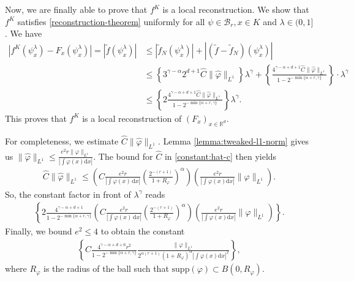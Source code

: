 Now, we are finally able to prove that $f^K$ is a local reconstruction. We show that $f^K$ satisfies \eqref{reconstruction-theorem} uniformly for all $\psi \in \mathcal{B}_r, x \in K$ and $\lambda \in (0,1]$. We have
\begin{align*}
    |f^K(\psi^\lambda_x) - F_x(\psi^\lambda_x)| = |\tilde f (\psi^\lambda_x)| 
    &\leq  |\tilde f_N (\psi^\lambda_x)| + |(\tilde f - \tilde f_N) (\psi^\lambda_x)| \\
    &\leq \left \{ 3^{\gamma - \alpha} 2^{d+1} \hat C  \lVert \hat \varphi\rVert_{L^1} \right \} \lambda^\gamma +  \left\{ \frac{ 4^{\gamma - \alpha + d + 1} \hat C \lVert \hat \varphi \rVert_{L^1} }{1-2^{-\min\{\alpha + r, \gamma\}}} \right\}\cdot \lambda^{\gamma}  \\
    &\leq  \left\{2\frac{  4^{\gamma - \alpha + d + 1} \hat C \lVert \hat \varphi \rVert_{L^1}}{1-2^{-\min\{\alpha + r, \gamma\}}} \right\} \lambda^{\gamma}.
\end{align*}
This proves that $f^K$ is a local reconstruction of $(F_x)_{x \in \mathbb{R}^d}$.

For completeness, we estimate $\hat C \lVert \hat \varphi \rVert_{L^1}$. Lemma \ref{lemma:tweaked-l1-norm} gives us $\lVert \hat \varphi \rVert_{L^1} \leq \frac{e^2 r \lVert \varphi \rVert_{L^1}}{|\int \varphi(x) \mathrm{d}x |} $. The bound for $\hat C$ in \eqref{constant:hat-c} then yields 
\begin{align}\label{chatnorml1}
    \hat C \lVert \hat \varphi \rVert_{L^1} \leq \left(C\frac{e^2 r}{|\int \varphi(x)\, \mathrm{d}x|} \left(\frac{2^{-(r+1)}}{1+R_\varphi}\right)^\alpha\right)\left( \frac{e^2 r}{|\int \varphi(x) \mathrm{d}x |} \lVert \varphi \rVert_{L^1}\right).
\end{align}
So, the constant factor in front of $\lambda^\gamma$ reads 
\begin{align*}
    \left\{2\frac{  4^{\gamma - \alpha + d + 1}}{1-2^{-\min\{\alpha + r, \gamma\}}} \left(C\frac{e^2 r}{|\int \varphi(x)\, \mathrm{d}x|} \left(\frac{2^{-(r+1)}}{1+R_\varphi}\right)^\alpha\right) \left(\frac{e^2 r}{|\int \varphi(x) \mathrm{d}x |} \lVert \varphi \rVert_{L^1}\right) \right\}.
\end{align*}
Finally, we bound $e^2 \leq 4$ to obtain the constant
\begin{align}\label{constant:rec-gamma-bigger-zero}
    \left\{C\frac{  4^{\gamma - \alpha + d + 6}r^2}{1-2^{-\min\{\alpha + r, \gamma\}}} \frac{\lVert \varphi \rVert_{L^1}}{2^{\alpha(r+1)} (1+R_\varphi)^{\alpha}|\int \varphi(x) \mathrm{d}x |^2}  \right\},
\end{align} 
where $R_\varphi$ is the radius of the ball such that $\mathrm{supp}(\varphi) \subset B(0, R_\varphi)$.  


